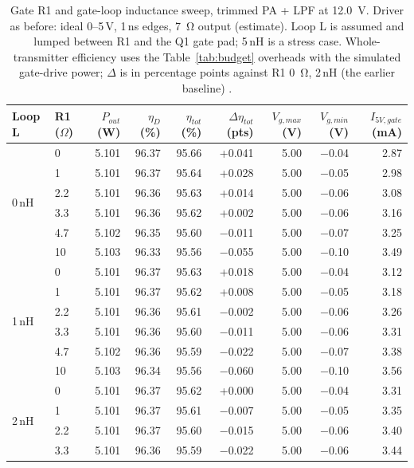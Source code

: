 \begin{table}[p]\centering\footnotesize\setlength{\tabcolsep}{3.5pt}
\caption{Gate R1 and gate-loop inductance sweep, trimmed PA + LPF at \SI{12.0}{\volt}\simv. Driver as before: ideal 0--5\,V, 1\,ns edges, \SI{7}{\ohm} output (estimate). Loop L is assumed and lumped between R1 and the Q1 gate pad; 5\,nH is a stress case. Whole-transmitter efficiency uses the Table~\ref{tab:budget} overheads with the simulated gate-drive power; $\Delta$ is in percentage points against R1 \SI{0}{\ohm}, 2\,nH (the earlier baseline) \cite{projsim}.}\label{tab:gate-r1}
\begin{tabular}{@{}llrrrrrrr@{}}\toprule
Loop L & R1 ($\Omega$) & $P_{out}$ (W) & $\eta_D$ (\%) & $\eta_{tot}$ (\%) & $\Delta\eta_{tot}$ (pts) & $V_{g,max}$ (V) & $V_{g,min}$ (V) & $I_{5V,gate}$ (mA) \\ \midrule
\multirow{6}{*}{0\,nH}  & 0 & 5.101 & 96.37 & 95.66 & +0.041 & 5.00 & $-$0.04 & 2.87 \\
 & 1 & 5.101 & 96.37 & 95.64 & +0.028 & 5.00 & $-$0.05 & 2.98 \\
 & 2.2 & 5.101 & 96.36 & 95.63 & +0.014 & 5.00 & $-$0.06 & 3.08 \\
 & 3.3 & 5.101 & 96.36 & 95.62 & +0.002 & 5.00 & $-$0.06 & 3.16 \\
 & 4.7 & 5.102 & 96.35 & 95.60 & $-$0.011 & 5.00 & $-$0.07 & 3.25 \\
 & 10 & 5.103 & 96.33 & 95.56 & $-$0.055 & 5.00 & $-$0.10 & 3.49 \\
\midrule
\multirow{6}{*}{1\,nH}  & 0 & 5.101 & 96.37 & 95.63 & +0.018 & 5.00 & $-$0.04 & 3.12 \\
 & 1 & 5.101 & 96.37 & 95.62 & +0.008 & 5.00 & $-$0.05 & 3.18 \\
 & 2.2 & 5.101 & 96.36 & 95.61 & $-$0.002 & 5.00 & $-$0.06 & 3.26 \\
 & 3.3 & 5.101 & 96.36 & 95.60 & $-$0.011 & 5.00 & $-$0.06 & 3.31 \\
 & 4.7 & 5.102 & 96.36 & 95.59 & $-$0.022 & 5.00 & $-$0.07 & 3.38 \\
 & 10 & 5.103 & 96.34 & 95.56 & $-$0.060 & 5.00 & $-$0.10 & 3.56 \\
\midrule
\multirow{6}{*}{2\,nH}  & 0 & 5.101 & 96.37 & 95.62 & +0.000 & 5.00 & $-$0.04 & 3.31 \\
 & 1 & 5.101 & 96.37 & 95.61 & $-$0.007 & 5.00 & $-$0.05 & 3.35 \\
 & 2.2 & 5.101 & 96.37 & 95.60 & $-$0.015 & 5.00 & $-$0.06 & 3.40 \\
 & 3.3 & 5.101 & 96.36 & 95.59 & $-$0.022 & 5.00 & $-$0.06 & 3.44 \\

\end{tabular}
\end{table}
